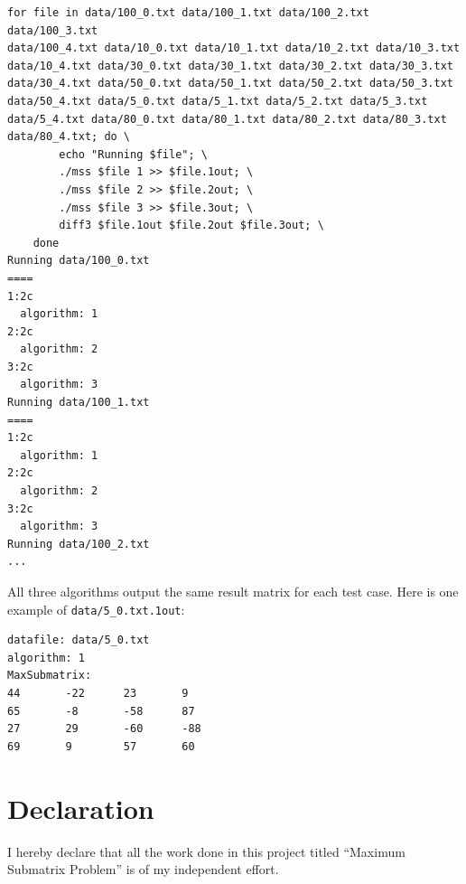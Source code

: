 \documentclass[a4paper,oneside]{book}
\begin{document}
\begin{verbatim}
for file in data/100_0.txt data/100_1.txt data/100_2.txt data/100_3.txt 
data/100_4.txt data/10_0.txt data/10_1.txt data/10_2.txt data/10_3.txt 
data/10_4.txt data/30_0.txt data/30_1.txt data/30_2.txt data/30_3.txt 
data/30_4.txt data/50_0.txt data/50_1.txt data/50_2.txt data/50_3.txt 
data/50_4.txt data/5_0.txt data/5_1.txt data/5_2.txt data/5_3.txt 
data/5_4.txt data/80_0.txt data/80_1.txt data/80_2.txt data/80_3.txt 
data/80_4.txt; do \
        echo "Running $file"; \
        ./mss $file 1 >> $file.1out; \
        ./mss $file 2 >> $file.2out; \
        ./mss $file 3 >> $file.3out; \
        diff3 $file.1out $file.2out $file.3out; \
    done
Running data/100_0.txt
====
1:2c
  algorithm: 1
2:2c
  algorithm: 2
3:2c
  algorithm: 3
Running data/100_1.txt
====
1:2c
  algorithm: 1
2:2c
  algorithm: 2
3:2c
  algorithm: 3
Running data/100_2.txt 
...
\end{verbatim}

All three algorithms output the same result matrix for each test case. Here is
one example of \verb|data/5_0.txt.1out|:

\begin{verbatim}
datafile: data/5_0.txt
algorithm: 1
MaxSubmatrix: 
44       -22      23       9        
65       -8       -58      87       
27       29       -60      -88      
69       9        57       60       
\end{verbatim}

\chapter{Declaration}

I hereby declare that all the work done in this project titled ``Maximum
Submatrix Problem'' is of my independent effort.
\end{document}

